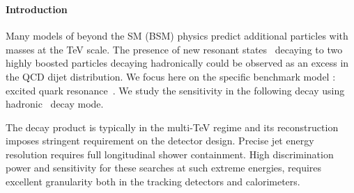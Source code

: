 \subsubsection{}



\paragraph*{Introduction}
Many models of beyond the SM (BSM) physics predict additional particles with masses at the TeV scale. The presence of new resonant states~\cite{Harris:2011bh,Boelaert:2009jm,Lee:1973iz,Branco:2011iw,Hill:1994hp,Kaplan:1983sm,Bellazzini:2014yua,Randall:1999ee,Pomarol:1999ad} decaying to two highly boosted particles decaying hadronically could be observed as an excess in the QCD dijet distribution. We focus here on the specific benchmark model : excited quark resonance~\cite{Baur:1987ga,Baur:1989kv}. We study the sensitivity in the following decay using hadronic \qjj\ decay mode.

The decay product is typically in the multi-TeV regime and its reconstruction imposes stringent requirement on the detector design. Precise jet energy resolution requires full longitudinal shower containment. High discrimination power and sensitivity for these searches at such extreme energies, requires excellent granularity both in the tracking detectors and calorimeters.

